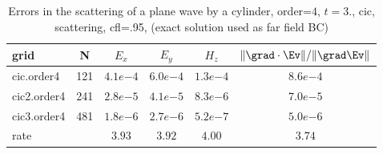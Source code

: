 \begin{table}[hbt]
\begin{center}
\begin{tabular}{|l|c|c|c|c|c|} \hline\hline 
grid  & N &  $E_x$ &  $E_y$ & $H_z$ & $\|\grad\cdot\Ev\|/\|\grad\Ev\|$\\ \hline 
cic.order4 &   121 &  $4.1e{ -4}$  &  $6.0e{ -4}$  &  $1.3e{ -4}$  &  $8.6e{ -4}$   \\ \hline
cic2.order4 &   241 &  $2.8e{ -5}$  &  $4.1e{ -5}$  &  $8.3e{ -6}$  &  $7.0e{ -5}$   \\ \hline
cic3.order4 &   481 &  $1.8e{ -6}$  &  $2.7e{ -6}$  &  $5.2e{ -7}$  &  $5.0e{ -6}$   \\ \hline
    rate            &     &       $3.93$ &       $3.92$ &       $4.00$ &       $3.74$  \\ \hline\hline
\end{tabular}
\caption{Errors in the scattering of a plane wave by a cylinder, order=$4$, $t=3.$, cic, scattering, cfl=.95, (exact solution used as far field BC)}\label{table:mx.cic}
\end{center}
\end{table}


